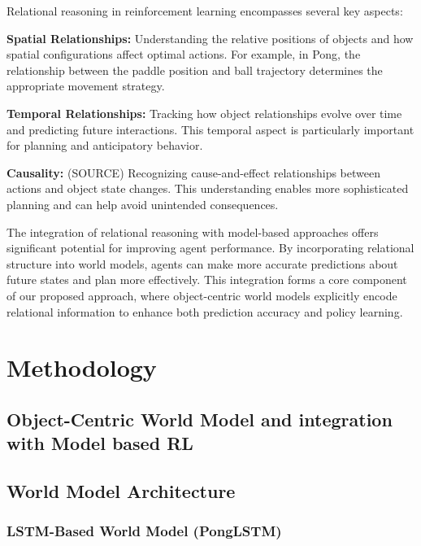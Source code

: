 \documentclass[
	english,
	ruledheaders=section,
	class=report,
	thesis={type=master},
	accentcolor=9c,
	custommargins=true,
	marginpar=false,
	parskip=half-,
	fontsize=11pt,
]{tudapub}
\begin{document}
Relational reasoning in reinforcement learning encompasses several key aspects:

\textbf{Spatial Relationships:} Understanding the relative positions of objects and how spatial configurations affect optimal actions. For example, in Pong, the relationship between the paddle position 
and ball trajectory determines the appropriate movement strategy.

\textbf{Temporal Relationships:} Tracking how object relationships evolve over time and predicting future interactions. This temporal aspect is particularly important for planning and anticipatory behavior.

\textbf{Causality:} (SOURCE) Recognizing cause-and-effect relationships between actions and object state changes. This understanding enables more sophisticated planning and can help avoid unintended consequences.

The integration of relational reasoning with model-based approaches offers significant potential for improving agent performance. By incorporating relational structure into world models, agents can make more 
accurate predictions about future states and plan more effectively. This integration forms a core component of our proposed approach, where object-centric world models explicitly encode relational information to enhance both prediction accuracy and policy learning.



\chapter{Methodology}
\label{chap:methodology}



\section{Object-Centric World Model and integration with Model based RL}
\label{sec:oc_world_model}




\section{World Model Architecture}
\label{sec:world_model_arch}

\subsection{LSTM-Based World Model (PongLSTM)}
\label{subsec:ponglstm}
\end{document}
